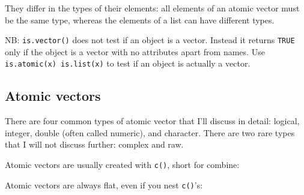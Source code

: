 They differ in the types of their elements: all elements of an atomic
vector must be the same type, whereas the elements of a list can have
different types.

NB: \texttt{is.vector()} does not test if an object is a vector. Instead
it returns \texttt{TRUE} only if the object is a vector with no
attributes apart from names. Use
\texttt{is.atomic(x) \textbar{}\textbar{} is.list(x)} to test if an
object is actually a vector.

\subsection{Atomic vectors}\label{atomic-vectors}

There are four common types of atomic vector that I'll discuss in
detail: logical, integer, double (often called numeric), and character.
There are two rare types that I will not discuss further: complex and
raw.

Atomic vectors are usually created with \texttt{c()}, short for combine:

\begin{Shaded}
\begin{Highlighting}[]
\StringTok{ }\NormalTok{(}\NormalTok{, }\NormalTok{, }\NormalTok{)}
\StringTok{ }
\StringTok{ }\NormalTok{(}\NormalTok{, }
\StringTok{ }\NormalTok{(}\NormalTok{, }\NormalTok{)}
\end{Highlighting}
\end{Shaded}

Atomic vectors are always flat, even if you nest \texttt{c()}'s:

\begin{Shaded}
\begin{Highlighting}[]
\NormalTok{(}\NormalTok{, }\NormalTok{(}\NormalTok{, }\NormalTok{(}\NormalTok{, }\NormalTok{)))}
\NormalTok{(}\NormalTok{, }\NormalTok{, }\NormalTok{, }\NormalTok{)}
\end{Highlighting}
\end{Shaded}

